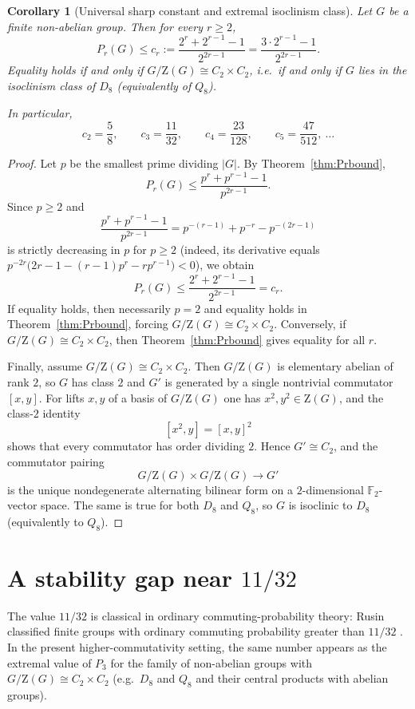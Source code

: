 \documentclass[11pt]{article}
\newtheorem{corollary}[theorem]{Corollary}
\theoremstyle{definition}
\theoremstyle{remark}
\theoremstyle{definition}
\theoremstyle{plain}
\newcommand{\Z}{\mathrm{Z}}
\begin{document}
\begin{corollary}[Universal sharp constant and extremal isoclinism class]\label{cor:universal-bound}
Let $G$ be a finite non-abelian group. Then for every $r\ge 2$,
\[
P_r(G)\le c_r:=\frac{2^r+2^{r-1}-1}{2^{2r-1}}=\frac{3\cdot 2^{r-1}-1}{2^{2r-1}}.
\]
Equality holds if and only if $G/\Z(G)\cong C_2\times C_2$, i.e.\ if and only if $G$ lies in the isoclinism
class of $D_8$ (equivalently of $Q_8$).

In particular,
\[
c_2=\frac58,\qquad c_3=\frac{11}{32},\qquad c_4=\frac{23}{128},\qquad c_5=\frac{47}{512},\ \dots
\]
\end{corollary}

\begin{proof}
Let $p$ be the smallest prime dividing $|G|$.
By Theorem~\ref{thm:Prbound},
\[
P_r(G)\le \frac{p^r+p^{r-1}-1}{p^{2r-1}}.
\]
Since $p\ge 2$ and
\[
\frac{p^r+p^{r-1}-1}{p^{2r-1}}=p^{-(r-1)}+p^{-r}-p^{-(2r-1)}
\]
is strictly decreasing in $p$ for $p\ge 2$ (indeed, its derivative equals
$p^{-2r}\bigl(2r-1-(r-1)p^r-rp^{r-1}\bigr)<0$), we obtain
\[
P_r(G)\le \frac{2^r+2^{r-1}-1}{2^{2r-1}}=c_r.
\]
If equality holds, then necessarily $p=2$ and equality holds in Theorem~\ref{thm:Prbound}, forcing
$G/\Z(G)\cong C_2\times C_2$.
Conversely, if $G/\Z(G)\cong C_2\times C_2$, then Theorem~\ref{thm:Prbound} gives equality for all $r$.

Finally, assume $G/\Z(G)\cong C_2\times C_2$.
Then $G/\Z(G)$ is elementary abelian of rank $2$, so $G$ has class $2$ and $G'$ is generated by a single nontrivial commutator $[x,y]$.
For lifts $x,y$ of a basis of $G/\Z(G)$ one has $x^2,y^2\in \Z(G)$, and the class-$2$ identity
\[
[x^2,y]=[x,y]^2
\]
shows that every commutator has order dividing $2$.
Hence $G'\cong C_2$, and the commutator pairing
\[
G/\Z(G)\times G/\Z(G)\longrightarrow G'
\]
is the unique nondegenerate alternating bilinear form on a $2$-dimensional $\mathbb F_2$-vector space.
The same is true for both $D_8$ and $Q_8$, so $G$ is isoclinic to $D_8$ (equivalently to $Q_8$).
\end{proof}

\section{A stability gap near \texorpdfstring{$11/32$}{11/32}}

The value $11/32$ is classical in ordinary commuting-probability theory: Rusin classified finite groups with ordinary commuting probability greater than $11/32$ \cite{Rusin1979}. In the present higher-commutativity setting, the same number appears as the extremal value of $P_3$ for the family of non-abelian groups with
$G/\Z(G)\cong C_2\times C_2$ (e.g.\ $D_8$ and $Q_8$ and their central products with abelian groups).
\end{document}

